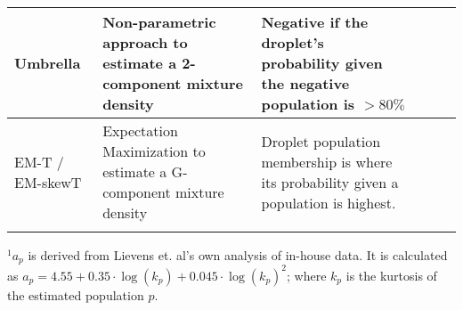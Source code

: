 \begin{table}
\begin{tabularx}{\textwidth}{p{2.7cm}*{5}{X}}
        \hline
        Umbrella                                                     & Non-parametric approach to estimate a 2-component mixture density                                                                                        & Negative if the droplet’s probability   given the negative population is \(> 80\%\)                                                                                                             \\ 
        \hline
        EM-T / \newline EM-skewT    & Expectation Maximization to estimate a G-component mixture density                                                                                       & Droplet population membership is where its probability given a population is highest.                                                                                                           \\ 
        \arrayrulecolor{black}
        \bottomrule    
    \end{tabularx}
    {\footnotesize \(^1a_p\) is derived from Lievens et. al's own analysis of in-house data. It is calculated as \(a_p = 4.55 + 0.35 \cdot \log{(k_p)}+0.045 \cdot \log{(k_p)}^2\); where \(k_p\) is the kurtosis of the estimated population \(p\).}
    \label{tab:methodscomparison}
\end{table}

